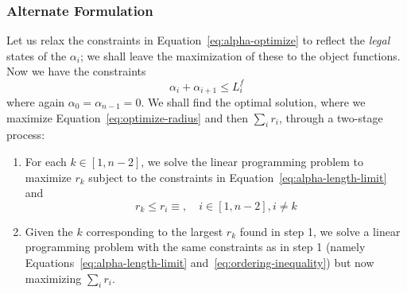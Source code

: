 \documentclass{article}
\begin{document}
\subsubsection{Alternate Formulation}
\label{sec:alt-form}
%
Let us relax the constraints in Equation~\eqref{eq:alpha-optimize} to reflect the \emph{legal} states of the $\alpha_i$; we shall leave the maximization of these to the object functions.  Now we have the constraints
%
\begin{equation}
  \label{eq:alpha-length-limit}
  \alpha_i + \alpha_{i+1} \le L^f_i
\end{equation}
%
where again $\alpha_0 = \alpha_{n-1} = 0$.  We shall find the optimal solution, where we maximize Equation~\eqref{eq:optimize-radius} and then $\sum_i r_i$, through a two-stage process:
%
\begin{enumerate}
\item For each $k\in [1,n-2]$, we solve the linear programming problem to maximize $r_k$ subject to the constraints in Equation~\eqref{eq:alpha-length-limit} and
  \begin{equation}
    \label{eq:ordering-inequality}
    r_k \le r_i \equiv, \quad i \in [1,n-2], i \ne k
  \end{equation}
\item Given the $k$ corresponding to the largest $r_k$ found in step 1, we solve a linear programming problem with the same constraints as in step 1 (namely Equations~\eqref{eq:alpha-length-limit} and~\eqref{eq:ordering-inequality}) but now maximizing $\sum_i r_i$.
\end{enumerate}
%
\end{document}
